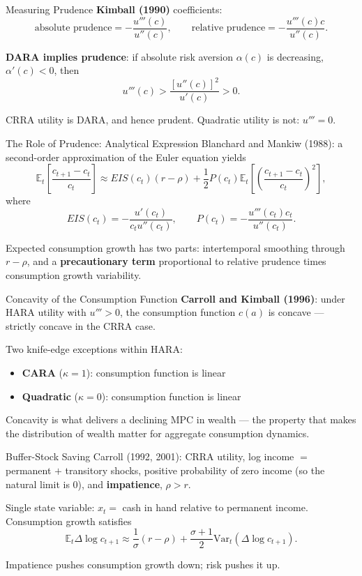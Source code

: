 \documentclass[blue]{beamer}
\newcommand{\E}{\mathbb{E}}
\begin{document}
	\begin{frame}{Measuring Prudence}
		\textbf{Kimball (1990)} coefficients:
		\[
		\text{absolute prudence} = -\frac{u'''(c)}{u''(c)}, \qquad \text{relative prudence} = -\frac{u'''(c)c}{u''(c)}.
		\]
		
		\bigskip
		\textbf{DARA implies prudence}: if absolute risk aversion $\alpha(c)$ is decreasing, $\alpha'(c) < 0$, then
		\[
		u'''(c) > \frac{[u''(c)]^2}{u'(c)} > 0.
		\]
		
		CRRA utility is DARA, and hence prudent. Quadratic utility is not: $u''' = 0$.
	\end{frame}
	
	\begin{frame}{The Role of Prudence: Analytical Expression}
		Blanchard and Mankiw (1988): a second-order approximation of the Euler equation yields
		\[
		\E_t\left[\frac{c_{t+1}-c_t}{c_t}\right] \approx EIS(c_t)(r - \rho) + \frac{1}{2} P(c_t) \E_t\left[\left(\frac{c_{t+1}-c_t}{c_t}\right)^2\right],
		\]
		where
		\[
		EIS(c_t) = -\frac{u'(c_t)}{c_t u''(c_t)}, \qquad P(c_t) = -\frac{u'''(c_t) c_t}{u''(c_t)}.
		\]
		
		Expected consumption growth has two parts: intertemporal smoothing through $r - \rho$, and a \textbf{precautionary term} proportional to relative prudence times consumption growth variability.
	\end{frame}
	
	\begin{frame}{Concavity of the Consumption Function}
		\textbf{Carroll and Kimball (1996)}: under HARA utility with $u''' > 0$, the consumption function $c(a)$ is concave --- strictly concave in the CRRA case.
		
		\bigskip
		Two knife-edge exceptions within HARA:
		\begin{itemize}
			\item \textbf{CARA} ($\kappa = 1$): consumption function is linear
			\item \textbf{Quadratic} ($\kappa = 0$): consumption function is linear
		\end{itemize}
		
		\bigskip
		Concavity is what delivers a declining MPC in wealth --- the property that makes the distribution of wealth matter for aggregate consumption dynamics.
	\end{frame}
	
	\begin{frame}{Buffer-Stock Saving}
		Carroll (1992, 2001): CRRA utility, log income $=$ permanent $+$ transitory shocks, positive probability of zero income (so the natural limit is 0), and \textbf{impatience}, $\rho > r$.
		
		\bigskip
		Single state variable: $x_t =$ cash in hand relative to permanent income. Consumption growth satisfies
		\[
		\E_t \Delta\log c_{t+1} \approx \frac{1}{\sigma}(r - \rho) + \frac{\sigma+1}{2}\text{Var}_t(\Delta\log c_{t+1}).
		\]
		
		Impatience pushes consumption growth down; risk pushes it up.
	\end{frame}
	
\end{document}
